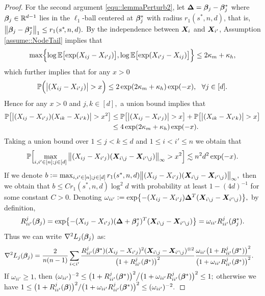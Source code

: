 \documentclass[twoside,11pt]{article}
\newcommand{\defeq}{\vcentcolon=}
\newcommand*{\BR}{\mathbb{R}}
\newcommand*{\bbetas}{\bbeta^*}
\newcommand*{\hessss}{\nabla^2  {L_j}(\bbeta_{j})}
\newcommand*{\bbetass}{\bbeta^*_{j}}
\begin{document}
\begin{proof}
For the second argument \eqref{equ::lemmaPerturb2}, let $\bDelta = \bbeta_j - \bbetass$ where $\bbeta_j\in \BR^{d-1}$  lies in the $\ell_1$-ball centered at $\bm{\beta}_j^*$ with radius $r_1(s^*,n,d)$, that is, $\bigl \| \bbeta_j - \bbetass \bigr \|_1 \leq r_1(s^*\!,n,d).$ 
By the independence between $\bm{X}_i$ and $\bm{X}_{i'}$, Assumption \ref{assume::NodeTail} implies that 
$$
\max\Bigl\{ \log \mathbb{E} \bigl[\exp(X_{ij} - X_{i'j}) \bigr] , \log \mathbb{E} \bigl[\exp(X_{i'j}- X_{ij}) \bigr] \Bigr\} \leq 2\kappa_m + \kappa_h,
$$ 
which further implies that for any $x > 0$
$$
\mathbb{P}\Bigl(  \bigl |( X_{ij} - X_{i'j})\bigr| > x \Bigr) \leq 2 \exp(2\kappa_m + \kappa_h) \exp(-x),~~\forall j \in [d].
$$
Hence  for any $x > 0$ and $j,k\in [d],$ a union bound implies that
 \begin{align}\label{equ::largeDeviation2}
 \mathbb{P}\bigl[  \bigl |( X_{ij} - X_{i'j})(X_{ik} - X_{i'k})\bigr| > x^2 \bigr] &\leq \mathbb{P}\bigl[  \bigl |( X_{ij} - X_{i'j})\bigr| > x \bigr] + \mathbb{P}\bigl[ \bigl |( X_{ik} - X_{i'k})\bigr| > x \bigr]\notag\\
 &\leq 4 \exp(2\kappa_m + \kappa_h)\exp(-x).
 \end{align}
 Taking a union bound over $1\!\!\leq j\!<\!k\!\!\leq d $ and $1 \leq i<i'\leq n$ we obtain that 
$$
\mathbb{P}\Bigl[ \max_{i,i'\in[n]; j\in[d]} \big\| (X_{ij} - X_{i'j} )( \bm{X}_{i \setminus j} - \bm{X}_{i' \setminus j})\big\|_{\infty} > x^2\Bigr] \lesssim  n^2 d^2 \exp(-x).
$$
If we denote $b \defeq \max_{i,i'\in[n]; j\in[d]}r_1(s^*,n,d)\big\| (X _{ij} - X_{i'j} )( \bX _{i \setminus j} - \bX_{i' \setminus j})\big\|_{\infty},$  then we obtain that $b \leq Cr_1(s^*,n,d) \log^2 d$ with probability at least $1 - (4d)^{-1}$ for some constant $C >0.$
Denoting $\omega_{ii'} \defeq \exp \bigl \{ -(X_{ij } - X_{i'j} ) \bDelta^T (\bX_{i\setminus j} - \bX_{i' \setminus j})\bigr \},$  by definition, 
$$ R_{i i'}^j(\bbeta_j) = \exp \bigl \{ -(X_{ij } - X_{i'j} )  (\bDelta + \bbetass)^T (\bX _{i\setminus j} - \bX_{i' \setminus j})\bigr \} = \omega_{ii'}R_{ii'}^j(\bbetass).$$ 
Thus we can write $ \hessss$ as:
\begin{align}
\hessss & = \frac{2}{n(n-1)} \sum\limits_{i<i'} \frac{R_{ii'}^j(\bbetas) (X_{ij } - X_{i'j} )^2 (\bX_{i\setminus j} - \bX_{i' \setminus j} ) ^{\otimes 2}}{\bigl(1 + R_{ii'}^j(\bbetas)\bigr)^2 } \frac{\omega_{ii'} \bigl(1 + R_{ii'}^j (\bbetas)\bigr)^2 }{ \bigl(1 +\omega_{ii'}R_{ii'}^j(\bbetas)\bigr)^2}. \label{equ::hessLemma1}
\end{align}
If $ \omega_{ii'} \geq 1$, then $ (  \omega_{ii'})^{-2}\leq \bigl(1 + R_{ii'}^j (\bbetas)\bigr)^2 \big/ \bigl (1 +  \omega_{ii'}R_{ii'}^j(\bbetas)\bigr)^2\leq 1 ;$ otherwise we have $ 1\leq \bigl(1 + R_{ii'}^j (\bbeta)\bigr )^2 / \bigl (1 +\omega_{ii'}R_{ii'}^j(\bbetas) \bigr )^2 \leq ( \omega_{ii'})^{-2} .$

\end{proof}
\end{document}
